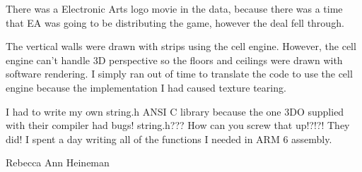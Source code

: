 {There was a Electronic Arts logo movie in the data, because there was a time that EA was going to be distributing the game, however the deal fell through.\\
\par
The vertical walls were drawn with strips using the cell engine. However, the cell engine can't handle 3D perspective so the floors and ceilings were drawn with software rendering. I simply ran out of time to translate the code to use the cell engine because the implementation I had caused texture tearing.\\
\par
I had to write my own string.h ANSI C library because the one 3DO supplied with their compiler had bugs! string.h??? How can you screw that up!?!?! They did! I spent a day writing all of the functions I needed in ARM 6 assembly.}{Rebecca Ann Heineman}



